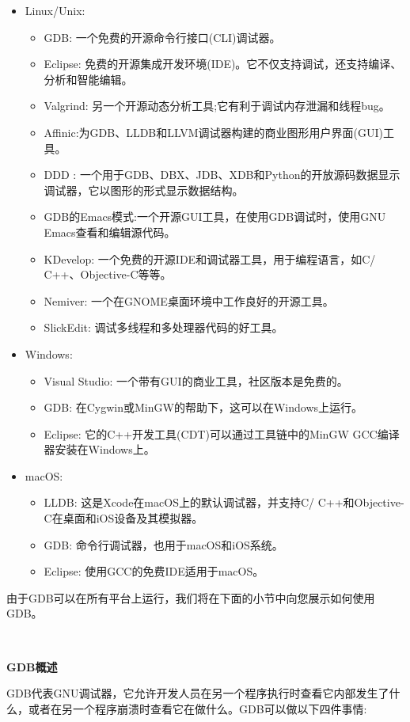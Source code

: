 \begin{itemize}
	\item Linux/Unix:
	\begin{itemize}
		\item GDB: 一个免费的开源命令行接口(CLI)调试器。
		\item Eclipse: 免费的开源集成开发环境(IDE)。它不仅支持调试，还支持编译、分析和智能编辑。
		\item Valgrind: 另一个开源动态分析工具;它有利于调试内存泄漏和线程bug。
		\item Affinic:为GDB、LLDB和LLVM调试器构建的商业图形用户界面(GUI)工具。
		\item DDD : 一个用于GDB、DBX、JDB、XDB和Python的开放源码数据显示调试器，它以图形的形式显示数据结构。
		\item GDB的Emacs模式:一个开源GUI工具，在使用GDB调试时，使用GNU Emacs查看和编辑源代码。
		\item KDevelop: 一个免费的开源IDE和调试器工具，用于编程语言，如C/ C++、Objective-C等等。
		\item Nemiver: 一个在GNOME桌面环境中工作良好的开源工具。
		\item SlickEdit: 调试多线程和多处理器代码的好工具。
	\end{itemize}
	\item Windows:
	\begin{itemize}
		\item Visual Studio: 一个带有GUI的商业工具，社区版本是免费的。
		\item GDB: 在Cygwin或MinGW的帮助下，这可以在Windows上运行。
		\item Eclipse: 它的C++开发工具(CDT)可以通过工具链中的MinGW GCC编译器安装在Windows上。
	\end{itemize}
	\item macOS:
	\begin{itemize}
		\item LLDB: 这是Xcode在macOS上的默认调试器，并支持C/ C++和Objective-C在桌面和iOS设备及其模拟器。
		\item GDB: 命令行调试器，也用于macOS和iOS系统。
		\item Eclipse: 使用GCC的免费IDE适用于macOS。
	\end{itemize}
\end{itemize}

由于GDB可以在所有平台上运行，我们将在下面的小节中向您展示如何使用GDB。 \par

\noindent\textbf{}\ \par
\textbf{GDB概述} \ \par
GDB代表GNU调试器，它允许开发人员在另一个程序执行时查看它内部发生了什么，或者在另一个程序崩溃时查看它在做什么。GDB可以做以下四件事情: \par

